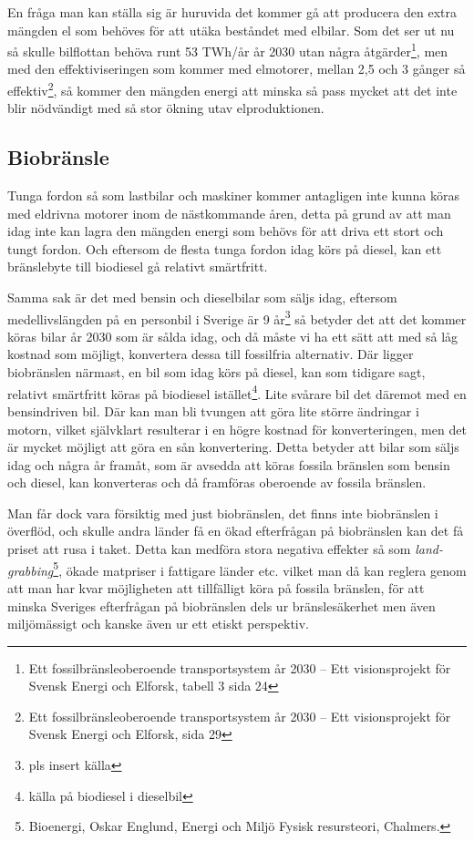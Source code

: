 \documentclass[a4paper,11pt,fleqn, titlepage]{article}
\begin{document}
En fråga man kan ställa sig är huruvida det kommer gå att producera den
extra mängden el som behöves för att utäka beståndet med elbilar. Som det
ser ut nu så skulle bilflottan behöva runt 53 TWh/år år 2030 utan några
åtgärder\footnote{Ett fossilbränsleoberoende transportsystem år 2030 – Ett
visionsprojekt för Svensk Energi och Elforsk, tabell 3 sida 24}, men med
den effektiviseringen som kommer med elmotorer, mellan 2,5 och 3 gånger så
effektiv\footnote{Ett fossilbränsleoberoende transportsystem år 2030 – Ett
visionsprojekt för Svensk Energi och Elforsk, sida 29}, så kommer den
mängden energi att minska så pass mycket att det inte blir nödvändigt med
så stor ökning utav elproduktionen.

\subsection{Biobränsle}
Tunga fordon så som lastbilar och maskiner kommer antagligen inte kunna
köras med eldrivna motorer inom de nästkommande åren, detta på grund av att
man idag inte kan lagra den mängden energi som behövs för att driva ett
stort och tungt fordon. Och eftersom de flesta tunga fordon idag körs på
diesel, kan ett bränslebyte till biodiesel gå relativt smärtfritt.

Samma sak är det med bensin och dieselbilar som säljs idag, eftersom
medellivslängden på en personbil i Sverige är 9 år\footnote{pls insert
källa} så betyder det att det kommer köras bilar år 2030 som är sålda idag,
och då måste vi ha ett sätt att med så låg kostnad som möjligt, konvertera
dessa till fossilfria alternativ. Där ligger biobränslen närmast, en bil
som idag körs på diesel, kan som tidigare sagt, relativt smärtfritt köras
på biodiesel istället\footnote{källa på biodiesel i dieselbil}. Lite
svårare bil det däremot med en bensindriven bil. Där kan man bli tvungen
att göra lite större ändringar i motorn, vilket självklart resulterar i en
högre kostnad för konverteringen, men det är mycket möjligt att göra en sån
konvertering. Detta betyder att bilar som säljs idag och några år framåt,
som är avsedda att köras fossila bränslen som bensin och diesel, kan
konverteras och då framföras oberoende av fossila bränslen.

Man får dock vara försiktig med just biobränslen, det finns inte
biobränslen i överflöd, och skulle andra länder få en ökad efterfrågan på
biobränslen kan det få priset att rusa i taket. Detta kan medföra stora
negativa effekter så som \emph{land-grabbing}\footnote{Bioenergi, Oskar
Englund, Energi och Miljö Fysisk resursteori, Chalmers.}, ökade matpriser i
fattigare länder etc. vilket man då kan reglera genom att man har kvar
möjligheten att tillfälligt köra på fossila bränslen, för att minska
Sveriges efterfrågan på biobränslen dels ur bränslesäkerhet men även
miljömässigt och kanske även ur ett etiskt perspektiv.
\end{document}
